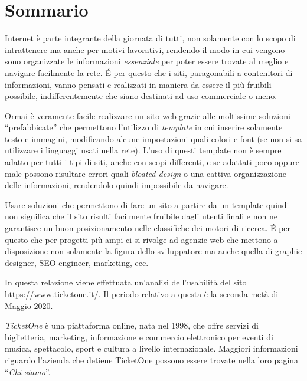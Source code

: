\section{Sommario}\label{sommario}

\par Internet è parte integrante della giornata di tutti, non solamente con lo scopo di intrattenere ma anche per motivi lavorativi, rendendo il modo in cui vengono sono organizzate le informazioni \textit{essenziale} per poter essere trovate al meglio e navigare facilmente la rete.
\'E per questo che i siti, paragonabili a contenitori di informazioni, vanno pensati e realizzati in maniera da essere il più fruibili possibile, indifferentemente che siano destinati ad uso commerciale o meno. 
\par Ormai è veramente facile realizzare un sito web grazie alle moltissime soluzioni ``prefabbicate'' che permettono l'utilizzo di \textit{template} in cui inserire solamente testo e immagini, modificando alcune impostazioni quali colori e font (se non si sa utilizzare i linguaggi usati nella rete).
L'uso di questi template non è sempre adatto per tutti i tipi di siti, anche con scopi differenti, e se adattati poco oppure male possono risultare errori quali \textit{bloated design} o una cattiva organizzazione delle informazioni, rendendolo quindi impossibile da navigare.
\par Usare soluzioni che permettono di fare un sito a partire da un template quindi non significa che il sito risulti facilmente fruibile dagli utenti finali e non ne garantisce un buon posizionamento nelle classifiche dei motori di ricerca.
\'E per questo che per progetti più ampi ci si rivolge ad agenzie web che mettono a disposizione non solamente la figura dello sviluppatore ma anche quella di graphic designer, SEO engineer, marketing, ecc.

\bigskip In questa relazione viene effettuata un'analisi dell'usabilità del sito \url{https://www.ticketone.it/}.
Il periodo relativo a questa è la seconda metà di Maggio 2020.

\par \textit{TicketOne} è una piattaforma online, nata nel 1998, che offre servizi di biglietteria, marketing, informazione e commercio elettronico per eventi di musica, spettacolo, sport e cultura a livello internazionale.
Maggiori informazioni riguardo l'azienda che detiene TicketOne possono essere trovate nella loro pagina ``\textit{\href{https://www.ticketone.it/campaign/chisiamo/}{Chi siamo}}''.

